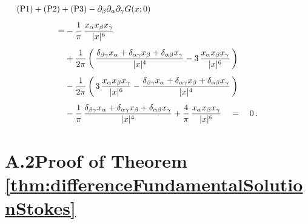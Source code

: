 \begin{align*}
  &\hspace{-2cm}\mathrm{(P1)} + \mathrm{(P2)} + \mathrm{(P3)} - \partial_\beta \partial_\alpha \partial_\gamma G(x; 0) \\[0.5em]
  = &- \frac{1}{\pi}\, \frac{x_\alpha x_\beta x_\gamma}{|x|^6} \\[0.5em]
    &+ \frac{1}{2\pi} \, \bigg(\,\frac{\delta_{\beta\gamma} x_\alpha + \delta_{\alpha \gamma} x_\beta + \delta_{\alpha \beta} x_\gamma}{|x|^4} - 3\, \frac{x_\alpha x_\beta x_\gamma}{|x|^6} \, \bigg) \\[0.5em]
    &- \frac{1}{2\pi} \, \bigg( \, 3\, \frac{x_\alpha x_\beta x_\gamma}{|x|^6} - \frac{\delta_{\beta\gamma} x_\alpha + \delta_{\alpha\gamma} x_\beta + \delta_{\alpha\beta} x_\gamma}{|x|^4} \, \bigg)\\[0.5em]
   &- \frac{1}{\pi}\, \frac{\delta_{\beta \gamma} x_\alpha + \delta_{\alpha \gamma} x_\beta + \delta_{\alpha\beta} x_\gamma}{|x|^4} 
     + \frac{4}{\pi}\, \frac{x_\alpha x_\beta x_\gamma}{|x|^6} 
     \quad=\quad 0 \,.
\end{align*}


\section*{A.2\quad Proof of Theorem \ref{thm:differenceFundamentalSolutionStokes}}
\label{sec:A2}

